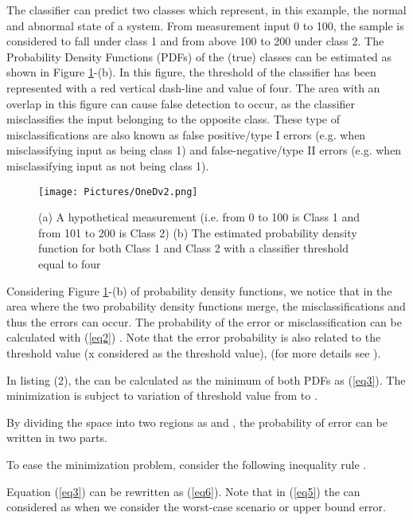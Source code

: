 \documentclass{article}
\begin{document}
The classifier  can predict two classes which represent, in this example, the normal and abnormal state of a system. From measurement input 0 to 100, the sample is considered to fall under class 1 and from above 100 to 200 under class 2. The Probability Density Functions (PDFs) of the (true) classes can be estimated as shown in Figure \ref{fig1}-(b). In this figure, the threshold of the classifier has been represented with a red vertical dash-line and value of four. The area with an overlap in this figure can cause false detection to occur, as the classifier misclassifies the input belonging to the opposite class. These type of misclassifications are also known as false positive/type I errors (e.g. when misclassifying input as being class 1) and false-negative/type II errors (e.g. when misclassifying input as not being class 1).
\begin{figure}
\texttt{[image: Pictures/OneDv2.png]}
\caption{(a) A hypothetical measurement (i.e. from 0 to 100 is Class 1 and from 101 to 200 is Class 2) (b) The estimated probability density function for both Class 1 and Class 2 with a classifier threshold equal to four} \label{fig1}
\end{figure}
Considering Figure \ref{fig1}-(b) of probability density functions, we notice that in the area where the two probability density functions merge, the misclassifications and thus the errors can occur. The probability of the error or misclassification can be calculated with (\ref{eq2}) \cite{Theodoridis2009}. Note that the error probability is also related to the threshold value (x considered as the threshold value), (for more details see \cite{aslansefat2020performance}).




In listing (2), the  can be calculated as the minimum of both PDFs as (\ref{eq3}). The minimization is subject to variation of threshold value from  to .



By dividing the space into two regions as  and , the probability of error can be written in two parts.



To ease the minimization problem, consider the following inequality rule \cite{fukunaga2013introduction}.
    


Equation (\ref{eq3}) can be rewritten as (\ref{eq6}). Note that in (\ref{eq5}) the  can considered as  when we consider the worst-case scenario or upper bound error.
\end{document}
